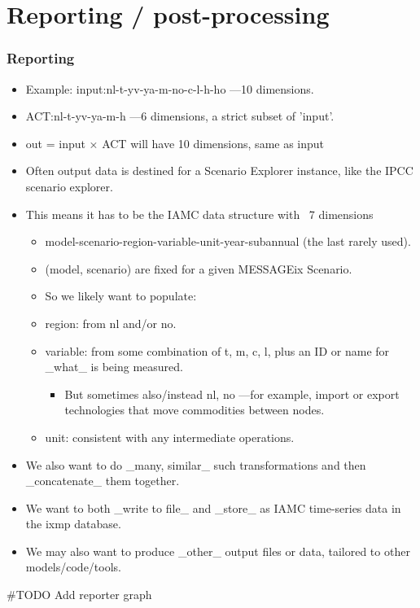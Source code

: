 \documentclass[12pt,aspectratio=169]{beamer}
\begin{document}
\section{Reporting / post-processing}

\begin{frame}[allowframebreaks]
\frametitle{Reporting}
\begin{itemize}
  \item Example: input:nl-t-yv-ya-m-no-c-l-h-ho —10 dimensions.
  \item ACT:nl-t-yv-ya-m-h —6 dimensions, a strict subset of 'input'.
  \item out = input × ACT will have 10 dimensions, same as input
  \item Often output data is destined for a Scenario Explorer instance, like the IPCC scenario explorer.
  \item This means it has to be the IAMC data structure with ~7 dimensions
    \begin{itemize}
      \item model-scenario-region-variable-unit-year-subannual (the last rarely used).
      \item (model, scenario) are fixed for a given MESSAGEix Scenario.
      \item So we likely want to populate:
      \item region: from nl and/or no.
      \item variable: from some combination of t, m, c, l, plus an ID or name for _what_ is being measured.
        \begin{itemize}
          \item But sometimes also/instead nl, no —for example, import or export technologies that move commodities between nodes.
        \end{itemize}
      \item unit: consistent with any intermediate operations.
    \end{itemize}
  \item We also want to do _many, similar_ such transformations and then _concatenate_ them together.
  \item We want to both _write to file_ and _store_ as IAMC time-series data in the ixmp database.
  \item We may also want to produce _other_ output files or data, tailored to other models/code/tools.
\end{itemize}

#TODO Add reporter graph
\end{frame}
\end{document}
